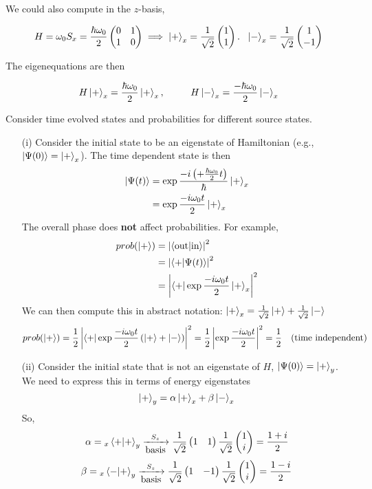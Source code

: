 \documentclass[english, 11pt]{article}
\begin{document}
    We could also compute in the $z$-basis,

    \[ H = \omega_0S_x = \frac{\hbar\omega_0}{2}\left(\begin{matrix}0&1\\1&0\end{matrix}\right) \implies \left|+\right\rangle_x = \frac{1}{\sqrt{2}}\left(\begin{matrix}1\\1\end{matrix}\right). \ \ \left|-\right\rangle_x = \frac{1}{\sqrt{2}}\left(\begin{matrix}1\\-1\end{matrix}\right) \]

    The eigenequations are then

    \[ H\kp_x = \f{\hbar\omega_0}{2} \kp_x , \ \ \ \ \ \ \ \ H\km_x = \f{-\hbar\omega_0}{2} \km_x \]

    Consider time evolved states and probabilities for different source states.

    \begin{itemize}
      \item[(i)] Consider the initial state to be an eigenstate of Hamiltonian (e.g., $\left|\Psi(0)\right\rangle = \left|+\right\rangle_x$). The time dependent state is then
      \begin{align*}
        \left|\Psi(t)\right\rangle & = \exp{\frac{-i \left( +\frac{\hbar\omega_0}{2}t \right)}{\hbar}}\left|+\right\rangle_x \\
                      & = \exp{\frac{-i\omega_0t}{2}}\left|+\right\rangle_x
      \end{align*}
      The overall phase does \textbf{not} affect probabilities. For example,
      \begin{align*}
        prob(\kp) & = \left| \braket{\mbox{out}}{\mbox{in}} \right|^2  \\
                  & = \pr{\braket{+}{\Psi(t)}} \\
                  & = \pr{\bra{+}\exp{\f{-i\omega_0t}{2}}\kp_x}
      \end{align*}
      We can then compute this in abstract notation: $\left|+\right\rangle_x = \frac{1}{\sqrt{2}}\left|+\right\rangle +\frac{1}{\sqrt{2}}\left|-\right\rangle $
      \[ prob(\left|+\right\rangle) = \frac{1}{2}\left|\left\langle+\right|\exp{\frac{-i\omega_0t}{2}}\left( \left|+\right\rangle + \left|-\right\rangle \right)\right|^2 = \frac{1}{2} \left|\exp{\frac{-i\omega_0t}{2}}\right|^2 = \frac{1}{2} \ \ \ \mbox{(time independent)} \]

      \item[(ii)] Consider the initial state that is not an eigenstate of $H$, $\left|\Psi(0)\right\rangle = \left|+\right\rangle_y$. We need to express this in terms of energy eigenstates
      \[ \left|+\right\rangle_y = \alpha\left|+\right\rangle_x + \beta\left|-\right\rangle_x \]
      So,
      \[ \alpha = {}_x\braket{+}{+}_y \xrightarrow[\mbox{basis}]{S_z} \f{1}{\sqrt{2}}\mtx{1 & 1}\f{1}{\sqrt{2}}\mtx{1 \\ i} = \f{1+i}{2}  \]
      \[ \beta = {}_x\braket{-}{+}_y \xrightarrow[\mbox{basis}]{S_z} \f{1}{\sqrt{2}}\mtx{1 & -1}\f{1}{\sqrt{2}}\mtx{1 \\ i} = \f{1-i}{2}  \]


\end{itemize}
\end{document}
